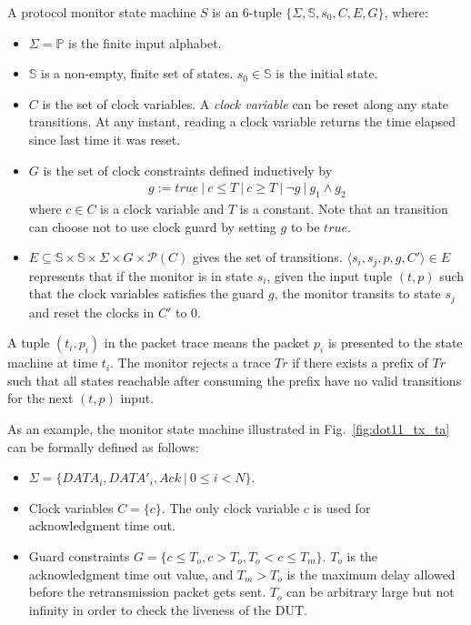 \begin{definition}
  A protocol monitor state machine $S$ is an 6-tuple $\{\Sigma, \mathbb{S}, s_0,
  C, E, G\}$, where:
  \begin{itemize}
    \item $\Sigma = \mathbb{P}$ is the finite input alphabet.
    \item $\mathbb{S}$ is a non-empty, finite set of states. $s_0 \in
      \mathbb{S}$ is the initial state.
    \item $C$ is the set of clock variables. A \textit{clock variable} can be
      reset along any state transitions. At any instant, reading a clock
      variable returns the time elapsed since last time it was reset.
    \item $G$ is the set of clock constraints defined inductively by
      \begin{align*}
        g := true\ |\ c \le T\ |\ c \ge T\ |\ \neg g\ |\ g_1 \land g_2
      \end{align*}%
      where $c \in C$ is a clock variable and $T$ is a constant. Note that an
      transition can choose not to use clock guard by setting $g$ to be $true$.
    \item $E \subseteq \mathbb{S} \times \mathbb{S} \times \Sigma \times  G \times \mathscr{P}(C)$
      gives the set of transitions. $\langle s_i, s_j, p, g, C'\rangle \in E$
      represents that if the monitor is in state $s_i$, given the input tuple
      $(t, p)$ such that the clock variables satisfies the guard $g$, the
      monitor transits to state $s_j$ and reset the clocks in $C'$ to 0.
  \end{itemize}
  \label{def:sm}
\end{definition}

A tuple $(t_i, p_i)$ in the packet trace means the packet $p_i$ is presented to
the state machine at time $t_i$. The monitor rejects a trace $Tr$ if there
exists a prefix of $Tr$ such that all states reachable after consuming the
prefix have no valid transitions for the next $(t, p)$ input.

As an example, the monitor state machine illustrated in
Fig.~\ref{fig:dot11_tx_ta} can be formally defined as follows:

\begin{itemize}
  \item $\Sigma = \{DATA_i, DATA'_i, Ack\ |\ 0 \le i < N\}$.
  \item Clock variables $C = \{c\}$. The only clock variable $c$ is
    used for acknowledgment time out.
  \item Guard constraints $G = \{ c \le T_o, c > T_o, T_o < c \le T_m\}$.
    $T_o$ is the acknowledgment time out value, and $T_m >
    T_o$ is the maximum delay allowed before the retransmission packet gets
    sent. $T_o$ can be arbitrary large but not infinity in order to check the
    liveness of the DUT.
\end{itemize}


